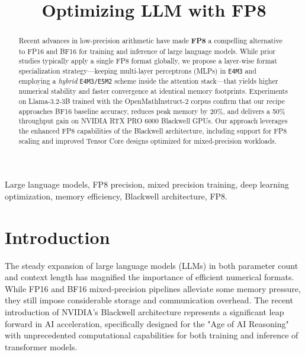 \documentclass[conference]{IEEEtran}
\begin{document}
\title{Optimizing LLM with FP8}

\author{
\and
{}
}

\maketitle

\begin{abstract}
Recent advances in low-precision arithmetic have made \textbf{FP8} \cite{micikevicius2022fp8formatsdeeplearning} a compelling alternative to FP16 and BF16 for training and inference of large language models. While prior studies typically apply a single FP8 format globally, we propose a layer-wise format specialization strategy—keeping multi-layer perceptrons (MLPs) in \texttt{E4M3} and employing a \textit{hybrid} \texttt{E4M3/E5M2} scheme inside the attention stack—that yields higher numerical stability and faster convergence at identical memory footprints. Experiments on Llama-3.2-3B \cite{meta2024llama3.2} trained with the OpenMathInstruct-2 corpus confirm that our recipe approaches BF16 baseline accuracy, reduces peak memory by 20\%, and delivers a 50\% throughput gain on NVIDIA RTX PRO 6000 Blackwell GPUs. Our approach leverages the enhanced FP8 capabilities of the Blackwell architecture, including support for FP8 scaling and improved Tensor Core designs optimized for mixed-precision workloads.
\end{abstract}

\begin{IEEEkeywords}
Large language models, FP8 precision, mixed precision training, deep learning optimization, memory efficiency, Blackwell architecture, FP8.
\end{IEEEkeywords}

\section{Introduction}
The steady expansion of large language models (LLMs) in both parameter count and context length has magnified the importance of efficient numerical formats. While FP16 and BF16 mixed-precision pipelines alleviate some memory pressure, they still impose considerable storage and communication overhead. The recent introduction of NVIDIA's Blackwell architecture \cite{blackwell2025} represents a significant leap forward in AI acceleration, specifically designed for the "Age of AI Reasoning" with unprecedented computational capabilities for both training and inference of transformer models.
\end{document}
